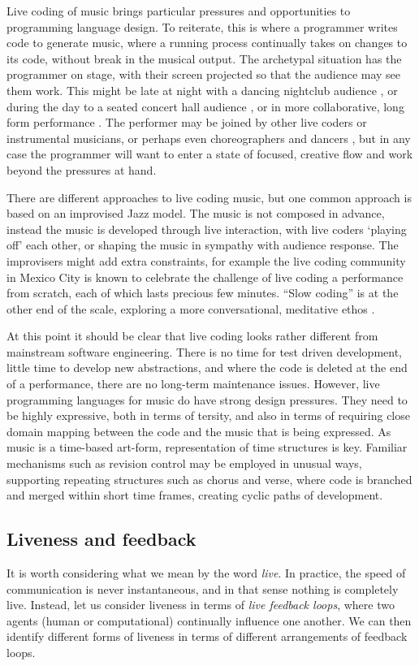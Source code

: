 \documentclass[authoryear,preprint]{sigplanconf}
\begin{document}
Live coding of music brings particular pressures and opportunities to
programming language design.  To reiterate, this is where a programmer
writes code to generate music, where a running process continually
takes on changes to its code, without break in the musical output. The
archetypal situation has the programmer on stage, with their screen
projected so that the audience may see them work. This might be late
at night with a dancing nightclub audience \citep[e.g. at an
  algorave;][]{Collins14}, or during the day to a seated concert hall
audience \citep[e.g. performance by laptop ensemble;][]{Ogborn14}, or
in more collaborative, long form performance \citep[e.g. slow
  coding;][]{Hall07}. The performer may be joined by other live coders
or instrumental musicians, or perhaps even choreographers and dancers
\citep{Sicchio14}, but in any case the programmer will want to enter a
state of focused, creative flow and work beyond the pressures at hand.

There are different approaches to live coding music, but one common
approach is based on an improvised Jazz model. The music is not
composed in advance, instead the music is developed through live
interaction, with live coders `playing off' each other, or shaping the
music in sympathy with audience response. The improvisers might add
extra constraints, for example the live coding community in Mexico
City is known to celebrate the challenge of live coding a performance
from scratch, each of which lasts precious few minutes. ``Slow
coding'' is at the other end of the scale, exploring a more
conversational, meditative ethos \citep{Hall07}.

At this point it should be clear that live coding looks rather
different from mainstream software engineering. There is no time for
test driven development, little time to develop new abstractions, and
where the code is deleted at the end of a performance, there are no
long-term maintenance issues. However, live programming languages for
music do have strong design pressures. They need to be highly
expressive, both in terms of tersity, and also in terms of requiring
close domain mapping between the code and the music that is being
expressed. As music is a time-based art-form, representation of time
structures is key. Familiar mechanisms such as revision control may be
employed in unusual ways, supporting repeating structures such as
chorus and verse, where code is branched and merged within short
time frames, creating cyclic paths of development.

\subsection{Liveness and feedback}
\label{sec:feedback}
It is worth considering what we mean by the word \emph{live}. In
practice, the speed of communication is never instantaneous, and in
that sense nothing is completely live. Instead, let us consider
liveness in terms of \emph{live feedback loops}, where two agents
(human or computational) continually influence one another. We can
then identify different forms of liveness in terms of different
arrangements of feedback loops.
\end{document}
